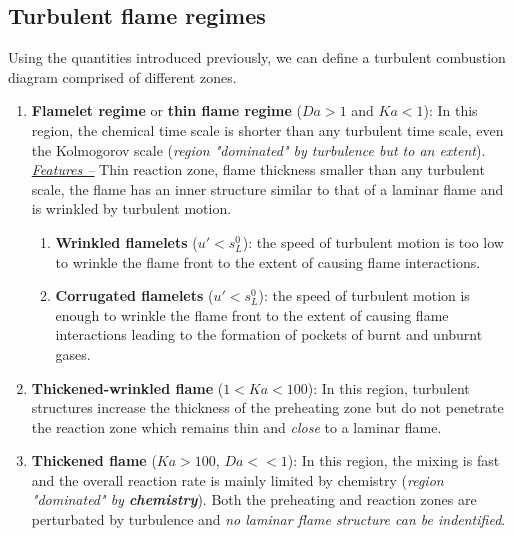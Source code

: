 \documentclass[a4paper,11pt]{article}
\begin{document}
\subsection{Turbulent flame regimes}
Using the quantities introduced previously, we can define a turbulent combustion diagram comprised of different zones.
\begin{enumerate}
	\item \textbf{Flamelet regime} or \textbf{thin flame regime} ($Da>1$ and $Ka<1$): In this region, the chemical time scale is shorter than any turbulent time scale, even the Kolmogorov scale (\textit{region "dominated" by turbulence but to an extent}).\\
	\underline{\textit{Features --}} Thin reaction zone, flame thickness smaller than any turbulent scale, the flame has an inner structure similar to that of a laminar flame and is wrinkled by turbulent motion.
	\begin{enumerate}
		\item \textbf{Wrinkled flamelets} ($u'<s^0_L$): the speed of turbulent motion is too low to wrinkle the flame front to the extent of causing flame interactions. 
		\item \textbf{Corrugated flamelets} ($u'<s^0_L$): the speed of turbulent motion is enough to wrinkle the flame front to the extent of causing flame interactions leading to the formation of pockets of burnt and unburnt gases.
	\end{enumerate}
	\item \textbf{Thickened-wrinkled flame} ($1<Ka<100$): In this region, turbulent structures increase the thickness of the preheating zone but do not penetrate the reaction zone which remains thin and \emph{close} to a laminar flame.
	\item \textbf{Thickened flame} ($Ka>100$, $Da<<1$): In this region, the mixing is fast and the overall reaction rate is mainly limited by chemistry (\textit{region "dominated" by \textbf{chemistry}}). Both the preheating and reaction zones are perturbated by turbulence and \emph{no laminar flame structure can be indentified}.
\end{enumerate}
\end{document}
